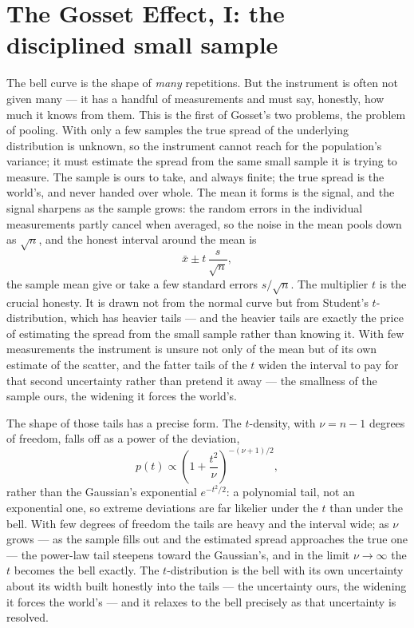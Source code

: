 \section{The Gosset Effect, I: the disciplined small sample}
\label{se:gosset-pooling}

The bell curve is the shape of \emph{many} repetitions. But the instrument is often not given many --- it has
a handful of measurements and must say, honestly, how much it knows from them. This is the first of Gosset's
two problems, the problem of pooling. With only a few samples the true spread of the underlying distribution
is unknown, so the instrument cannot reach for the population's variance; it must estimate the spread from the
same small sample it is trying to measure. The sample is ours to take, and always finite; the true spread is
the world's, and never handed over whole. The mean it forms is the signal, and the signal sharpens as the
sample grows: the random errors in the individual measurements partly cancel when averaged, so the noise in
the mean pools down as $\sqrt{n}$, and the honest interval around the mean is
\begin{equation}
  \bar{x} \pm t\,\frac{s}{\sqrt{n}},
\end{equation}
the sample mean give or take a few standard errors $s/\sqrt{n}$. The multiplier $t$ is the crucial honesty.
It is drawn not from the normal curve but from Student's $t$-distribution, which has heavier tails --- and the
heavier tails are exactly the price of estimating the spread from the small sample rather than knowing it.
With few measurements the instrument is unsure not only of the mean but of its own estimate of the scatter,
and the fatter tails of the $t$ widen the interval to pay for that second uncertainty rather than pretend it
away --- the smallness of the sample ours, the widening it forces the world's.

The shape of those tails has a precise form. The $t$-density, with $\nu = n - 1$ degrees of freedom, falls off
as a power of the deviation,
\begin{equation}
  p(t) \propto \left(1 + \frac{t^2}{\nu}\right)^{-(\nu+1)/2},
\end{equation}
rather than the Gaussian's exponential $e^{-t^2/2}$: a polynomial tail, not an exponential one, so extreme
deviations are far likelier under the $t$ than under the bell. With few degrees of freedom the tails are
heavy and the interval wide; as $\nu$ grows --- as the sample fills out and the estimated spread approaches the
true one --- the power-law tail steepens toward the Gaussian's, and in the limit $\nu \to \infty$ the $t$
becomes the bell exactly. The $t$-distribution is the bell with its own uncertainty about its width built
honestly into the tails --- the uncertainty ours, the widening it forces the world's --- and it relaxes to the
bell precisely as that uncertainty is resolved.

